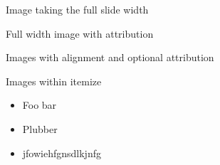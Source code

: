 \documentclass[11pt,compress,t,notes=noshow, xcolor=table]{beamer}
\begin{document}


\begin{frame}{Image taking the full slide width}
\end{frame}


\begin{frame}{Full width image with attribution}
\end{frame}


\begin{frame}{Images with alignment and optional attribution}
  
  
  
\end{frame}


\begin{frame}{Images within itemize}
  
  \begin{itemize}
    \item Foo bar
    \item Plubber
    \item jfowiehfgnsdlkjnfg
  \end{itemize}
  
  
\end{frame}
\end{document}
